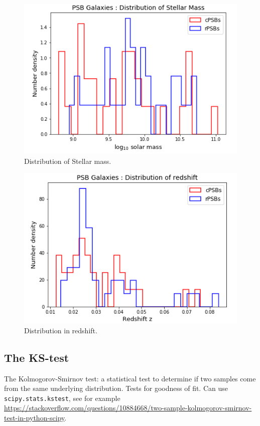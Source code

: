 \begin{figure}
    \centering
    \includegraphics[width=\columnwidth]{images/Stellar-mass-distribution.png}
    \caption{Distribution of Stellar mass.}
    \label{fig:stellar-mass-plot}
\end{figure}

\begin{figure}
    \centering
    \includegraphics[width=\columnwidth]{images/Redshift-distribution.png}
    \caption{Distribution in redshift.}
    \label{fig:redshift-plot}
\end{figure}

\subsection{The KS-test}
The Kolmogorov-Smirnov test: a statistical test to determine if two samples come from the same underlying distribution. Tests for goodness of fit. Can use \texttt{scipy.stats.kstest}, see for example \url{https://stackoverflow.com/questions/10884668/two-sample-kolmogorov-smirnov-test-in-python-scipy}.

